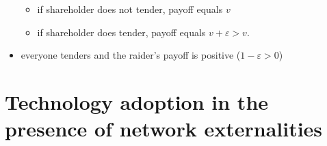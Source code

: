 \documentclass[11pt,english]{beamer}
\newcommand{\ve}{\varepsilon}
\begin{document}
\begin{frame}[allowframebreaks]
\begin{itemize}
\begin{itemize}
\item if shareholder does not tender, payoff equals $v$\\
\label{sec-5-1-15-1}%
\item if shareholder does tender, payoff equals $v+\ve>v$.\\
\label{sec-5-1-15-2}%
\end{itemize} %

\item everyone tenders and the raider's payoff is positive ($1-\ve>0$)\\
\label{sec-5-1-16}%
\end{itemize} %
\end{frame}
\section{Technology adoption in the presence of network externalities}
\label{sec-6}
\end{document}
